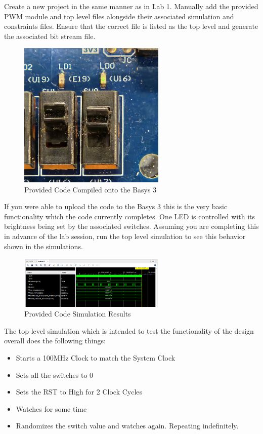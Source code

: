 
Create a new project in the same manner as in Lab 1. Manually add the provided PWM module and top level files alongside their associated simulation and constraints files. Ensure that the correct file is listed as the top level and generate the associated bit stream file. 
\begin{figure}[H]
    \centering
    \includegraphics[width = 7cm, angle = 180]{Images/ProvidedPWM/PWM_HardwareTest.jpg}
    \caption{Provided Code Compiled onto the Basys 3}
    \label{fig:enter-label}
\end{figure}
If you were able to upload the code to the Basys 3 this is the very basic functionality which the code currently completes. One LED is controlled with its brightness being set by the associated switches. Assuming you are completing this in advance of the lab session, run the top level simulation to see this behavior shown in the simulations.
\vspace{0.5cm}
\begin{figure}[H]
    \centering
    \includegraphics[width = 7cm]{Images/ProvidedPWM/Vivado_Simulate_Lab2_PWM_Module.png}
    \caption{Provided Code Simulation Results}
    \label{fig:enter-label}
\end{figure}
The top level simulation which is intended to test the functionality of the design overall does the following things: 
\begin{itemize}
    \item Starts a 100MHz Clock to match the System Clock
    \item Sets all the switches to 0
    \item Sets the RST to High for 2 Clock Cycles
    \item Watches for some time
    \item Randomizes the switch value and watches again. Repeating indefinitely. 

\end{itemize}

